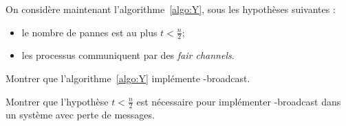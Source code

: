 
\begingroup


\begin{exercice}
  On considère maintenant l'algorithme~\ref{algo:Y}, sous les hypothèses suivantes : 
  \begin{itemize}
  \item le nombre de pannes est au plus $t < \frac{n}{2}$;
  \item les processus communiquent par des \emph{fair channels}.
  \end{itemize}
  
  \begin{algorithm}
    \caption{\URB-broadcast dans le modèle considéré (chaque message est considéré unique)}
    \label{algo:Y}
  \end{algorithm}

  \begin{questions}
  \item Montrer que l'algorithme~\ref{algo:Y} implémente \URB-broadcast. 
  \item Montrer que l'hypothèse $t < \frac{n}{2}$ est nécessaire pour
    implémenter \URB-broadcast dans un système avec perte de messages. 
  \end{questions}

\end{exercice}

\endgroup
\endinput
